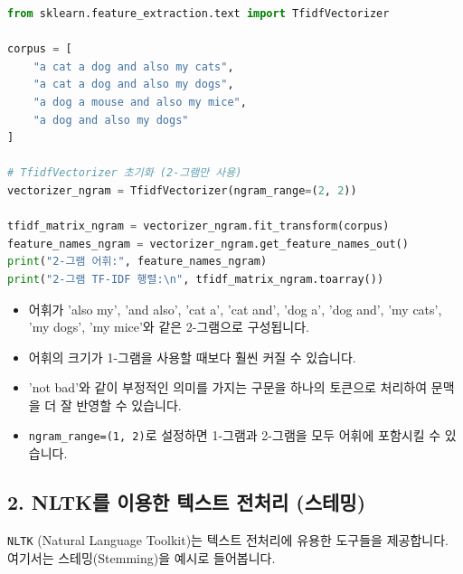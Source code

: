 \documentclass[11pt,a4paper]{article}
\begin{document}
\begin{examplebox}[title=2-그램 적용 코드 예시]
\begin{lstlisting}[language=Python, caption=2-그램 TF-IDF 벡터화 예시, label=lst:tfidf_ngram]
from sklearn.feature_extraction.text import TfidfVectorizer

corpus = [
    "a cat a dog and also my cats",
    "a cat a dog and also my dogs",
    "a dog a mouse and also my mice",
    "a dog and also my dogs"
]

# TfidfVectorizer 초기화 (2-그램만 사용)
vectorizer_ngram = TfidfVectorizer(ngram_range=(2, 2))

tfidf_matrix_ngram = vectorizer_ngram.fit_transform(corpus)
feature_names_ngram = vectorizer_ngram.get_feature_names_out()
print("2-그램 어휘:", feature_names_ngram)
print("2-그램 TF-IDF 행렬:\n", tfidf_matrix_ngram.toarray())
\end{lstlisting}
\end{examplebox}

\begin{tcolorbox}[mybox, title=코드 실행 결과 분석]
\begin{itemize}
    \item 어휘가 'also my', 'and also', 'cat a', 'cat and', 'dog a', 'dog and', 'my cats', 'my dogs', 'my mice'와 같은 2-그램으로 구성됩니다.
    \item 어휘의 크기가 1-그램을 사용할 때보다 훨씬 커질 수 있습니다.
    \item 'not bad'와 같이 부정적인 의미를 가지는 구문을 하나의 토큰으로 처리하여 문맥을 더 잘 반영할 수 있습니다.
    \item \texttt{ngram\_range=(1, 2)}로 설정하면 1-그램과 2-그램을 모두 어휘에 포함시킬 수 있습니다.
\end{itemize}
\end{tcolorbox}

\subsection*{2. NLTK를 이용한 텍스트 전처리 (스테밍)}
\texttt{NLTK} (Natural Language Toolkit)는 텍스트 전처리에 유용한 도구들을 제공합니다. 여기서는 스테밍(Stemming)을 예시로 들어봅니다.
\end{document}
